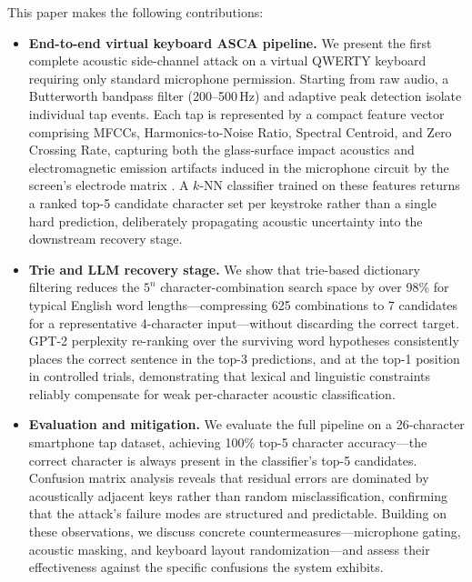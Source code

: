 \documentclass[conference]{IEEEtran}
\begin{document}
This paper makes the following contributions:

\begin{itemize}

  \item \textbf{End-to-end virtual keyboard ASCA pipeline.}
  We present the first complete acoustic side-channel attack on a virtual
  QWERTY keyboard requiring only standard microphone permission. Starting
  from raw audio, a Butterworth bandpass filter (200--500\,Hz) and adaptive
  peak detection isolate individual tap events. Each tap is represented by
  a compact feature vector comprising MFCCs, Harmonics-to-Noise Ratio,
  Spectral Centroid, and Zero Crossing Rate, capturing both the
  glass-surface impact acoustics and electromagnetic emission artifacts
  induced in the microphone circuit by the screen's electrode matrix
  \cite{EMnAcoustic2026}. A $k$-NN classifier trained on these features
  returns a ranked top-5 candidate character set per keystroke rather than
  a single hard prediction, deliberately propagating acoustic uncertainty
  into the downstream recovery stage.

  \item \textbf{Trie and LLM recovery stage.}
  We show that trie-based dictionary filtering reduces the $5^n$
  character-combination search space by over 98\% for typical English word
  lengths---compressing 625 combinations to 7 candidates for a
  representative 4-character input---without discarding the correct target.
  GPT-2 perplexity re-ranking over the surviving word hypotheses
  consistently places the correct sentence in the top-3 predictions, and
  at the top-1 position in controlled trials, demonstrating that lexical
  and linguistic constraints reliably compensate for weak per-character
  acoustic classification.

  \item \textbf{Evaluation and mitigation.}
  We evaluate the full pipeline on a 26-character smartphone tap dataset,
  achieving 100\% top-5 character accuracy---the correct character is
  always present in the classifier's top-5 candidates. Confusion matrix
  analysis reveals that residual errors are dominated by acoustically
  adjacent keys rather than random misclassification, confirming that the
  attack's failure modes are structured and predictable. Building on these
  observations, we discuss concrete countermeasures---microphone gating,
  acoustic masking, and keyboard layout randomization---and assess their
  effectiveness against the specific confusions the system exhibits.

\end{itemize}
\end{document}
